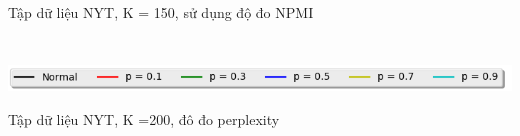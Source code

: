 \documentclass[pdf]{beamer}
\begin{document}
\begin{frame}{Tập dữ liệu NYT, K = 150, sử dụng độ đo NPMI }
\begin{columns}[T]
\begin{column}{.50\textwidth}
\begin{figure}
\end{figure}				
\end{column} %
\end{columns}
\begin{center}
\includegraphics[width=1\textwidth]{menu.png}	
\end{center}
\end{frame}


\begin{frame}{Tập dữ liệu NYT, K =200, đô đo perplexity}
\begin{columns}[T] %
\begin{column}{.50\textwidth}
\begin{figure}
\end{figure}
\end{column} %
\hfill%
\begin{column}{.50\textwidth}
\begin{figure}

\end{figure}
\end{column}
\end{columns}
\end{frame}
\end{document}
